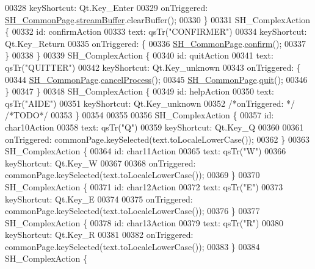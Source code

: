 \begin{DoxyCode}
00328         keyShortcut: Qt.Key\_Enter
00329         onTriggered: \hyperlink{classSH__CommonPage}{SH\_CommonPage}.\hyperlink{classSH__CommonPage_af59ae18e73706e3622c000c2005d9550}{streamBuffer}.clearBuffer();
00330     \}
00331     SH\_ComplexAction \{
00332         \textcolor{keywordtype}{id}: confirmAction
00333         text: qsTr(\textcolor{stringliteral}{"CONFIRMER"})
00334         keyShortcut: Qt.Key\_Return
00335         onTriggered: \{
00336             \hyperlink{classSH__CommonPage}{SH\_CommonPage}.\hyperlink{classSH__CommonPage_a66387106e42e843b3fd3ffbbcabbb8eb}{confirm}();
00337         \}
00338     \}
00339     SH\_ComplexAction \{
00340         \textcolor{keywordtype}{id}: quitAction
00341         text: qsTr(\textcolor{stringliteral}{"QUITTER"})
00342         keyShortcut: Qt.Key\_unknown
00343         onTriggered: \{
00344             \hyperlink{classSH__CommonPage}{SH\_CommonPage}.\hyperlink{classSH__CommonPage_a500427619a33ea991ed173fa0ac3b446}{cancelProcess}();
00345             \hyperlink{classSH__CommonPage}{SH\_CommonPage}.\hyperlink{classSH__CommonPage_a5b15093af63a454ca459407ba1283038}{quit}();
00346         \}
00347     \}
00348     SH\_ComplexAction \{
00349         \textcolor{keywordtype}{id}: helpAction
00350         text: qsTr(\textcolor{stringliteral}{"AIDE"})
00351         keyShortcut: Qt.Key\_unknown
00352         \textcolor{comment}{/*onTriggered: */} \textcolor{comment}{/*TODO*/}
00353     \}
00354 
00355 
00356     SH\_ComplexAction \{
00357         \textcolor{keywordtype}{id}: char10Action
00358         text: qsTr(\textcolor{stringliteral}{"Q"})
00359         keyShortcut: Qt.Key\_Q
00360 
00361         onTriggered: commonPage.keySelected(text.toLocaleLowerCase());
00362     \}
00363     SH\_ComplexAction \{
00364         \textcolor{keywordtype}{id}: char11Action
00365         text: qsTr(\textcolor{stringliteral}{"W"})
00366         keyShortcut: Qt.Key\_W
00367 
00368         onTriggered: commonPage.keySelected(text.toLocaleLowerCase());
00369     \}
00370     SH\_ComplexAction \{
00371         \textcolor{keywordtype}{id}: char12Action
00372         text: qsTr(\textcolor{stringliteral}{"E"})
00373         keyShortcut: Qt.Key\_E
00374 
00375         onTriggered: commonPage.keySelected(text.toLocaleLowerCase());
00376     \}
00377     SH\_ComplexAction \{
00378         \textcolor{keywordtype}{id}: char13Action
00379         text: qsTr(\textcolor{stringliteral}{"R"})
00380         keyShortcut: Qt.Key\_R
00381 
00382         onTriggered: commonPage.keySelected(text.toLocaleLowerCase());
00383     \}
00384     SH\_ComplexAction \{

\end{DoxyCode}

